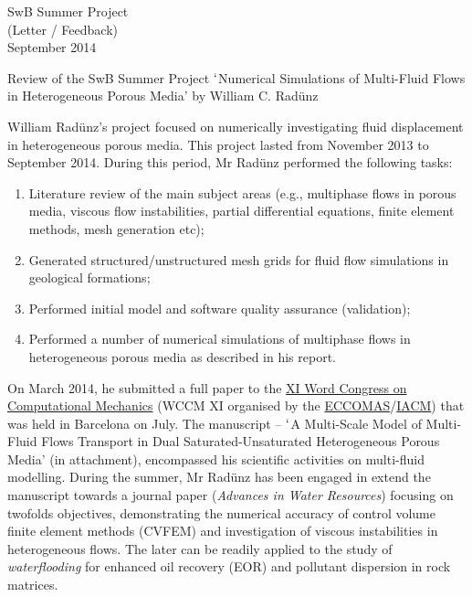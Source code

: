 \documentclass[14pt,twoside]{report}
\begin{document}
\clearpage

\begin{center}
\Huge{SwB Summer Project}\\
\huge{(Letter / Feedback)}\\
\huge{September 2014}
\end{center}

\vfill

\clearpage


\medskip

\begin{center}
{\Large Review of the SwB Summer Project $\lq$Numerical Simulations of Multi-Fluid Flows in Heterogeneous Porous Media' by William C. Rad\"unz}
\end{center}

William Rad\"unz's project focused on numerically investigating fluid displacement in heterogeneous porous media. This project lasted from November 2013 to September 2014. During this period, Mr Rad\"unz performed the following tasks:
\begin{enumerate}
\item Literature review of the main subject areas (e.g., multiphase flows in porous media, viscous flow instabilities, partial differential equations, finite element methods, mesh generation etc);
\item Generated structured/unstructured mesh grids for fluid flow simulations in geological formations;
\item Performed initial model and software quality assurance (validation);
\item Performed a number of numerical simulations of multiphase flows in heterogeneous porous media as described in his report. 
\end{enumerate} 

On March 2014, he submitted a full paper to the \href{http://www.wccm-eccm-ecfd2014.org/frontal/default.asp}{XI Word Congress on Computational Mechanics} (WCCM XI organised by the \href{http://www.eccomas.org/}{ECCOMAS}/\href{http://iacm.info/}{IACM}) that was held in Barcelona on July.  The manuscript -- $\lq$A Multi-Scale Model of Multi-Fluid Flows Transport in Dual Saturated-Unsaturated Heterogeneous Porous Media' (in attachment), encompassed his scientific activities on multi-fluid modelling. During the summer, Mr Rad\"unz has been engaged in extend the manuscript towards a journal paper ({\it Advances in Water Resources}) focusing on twofolds objectives, demonstrating the numerical accuracy of control volume finite element methods (CVFEM) and investigation of viscous instabilities in heterogeneous flows.  The later can be readily applied to the study of {\it waterflooding} for enhanced oil recovery (EOR) and pollutant dispersion in rock matrices.
\end{document}
